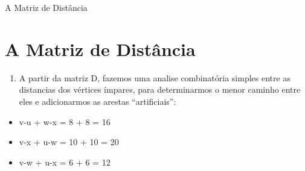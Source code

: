\documentclass[xcolor=table]{beamer}
\begin{document}
\begin{frame}{A Matriz de Distância}
\section{A Matriz de Distância}
    \begin{center}
        \begin{table}[]
\centering
\caption{A Matriz de Distância}
\label{my-label}

\end{table}
    \end{center}
    \begin{enumerate}[3]
        \item A partir da matriz D, fazemos uma analise combinatória simples entre as distancias dos vértices ímpares, para determinarmos o menor caminho entre eles e adicionarmos as arestas ``artificiais'':
    \end{enumerate}
    \begin{itemize}
        \item v-u + w-x = 8 + 8 = 16
        \item v-x + u-w = 10 + 10 = 20
        \item v-w + u-x = 6 + 6 = 12
    \end{itemize}
    
\end{frame}
\end{document}
